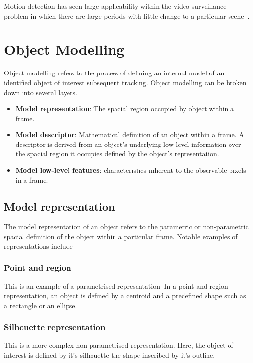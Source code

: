 Motion detection has seen large applicability within the video surveillance
problem in which there are large periods with little change to a particular
scene~\cite{Piccardi2004,Mashak2010}.

\section{Object Modelling}\label{literature_review_object_modelling}
Object modelling refers to the process of defining an internal model of
an identified object of interest subsequent tracking. Object modelling can be
broken down into several layers.
\begin{itemize}
    \item \textbf{Model representation}: The spacial region occupied by object within a
        frame.
    \item \textbf{Model descriptor}: Mathematical definition of an object within
        a frame. A descriptor is derived from an object's underlying low-level information over the spacial
        region it occupies defined by the object's representation.
    \item \textbf{Model low-level features}: characteristics inherent to the
        observable pixels in a frame.
\end{itemize}

\subsection{Model representation}
The model representation of an object refers to the parametric or non-parametric
spacial definition of the object within a particular frame. Notable examples of
representations include

\subsubsection{Point and region}
This is an example of a parametrised representation. In a point and region
representation, an object is defined by a centroid and a predefined shape such
as a rectangle or an ellipse.

\subsubsection{Silhouette representation}
This is a more complex non-parametrised representation. Here, the object of
interest is defined by it's silhouette-the shape inscribed by it's outline.

